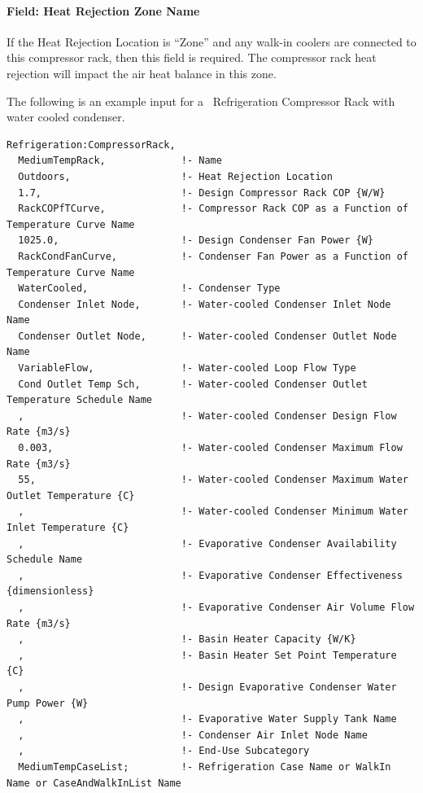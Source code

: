 \paragraph{Field: Heat Rejection Zone Name}\label{field-heat-rejection-zone-name}

If the Heat Rejection Location is ``Zone'' and any walk-in coolers are connected to this compressor rack, then this field is required. The compressor rack heat rejection will impact the air heat balance in this zone.

The following is an example input for a~ Refrigeration Compressor Rack with water cooled condenser.

\begin{lstlisting}
Refrigeration:CompressorRack,
  MediumTempRack,             !- Name
  Outdoors,                   !- Heat Rejection Location
  1.7,                        !- Design Compressor Rack COP {W/W}
  RackCOPfTCurve,             !- Compressor Rack COP as a Function of Temperature Curve Name
  1025.0,                     !- Design Condenser Fan Power {W}
  RackCondFanCurve,           !- Condenser Fan Power as a Function of Temperature Curve Name
  WaterCooled,                !- Condenser Type
  Condenser Inlet Node,       !- Water-cooled Condenser Inlet Node Name
  Condenser Outlet Node,      !- Water-cooled Condenser Outlet Node Name
  VariableFlow,               !- Water-cooled Loop Flow Type
  Cond Outlet Temp Sch,       !- Water-cooled Condenser Outlet Temperature Schedule Name
  ,                           !- Water-cooled Condenser Design Flow Rate {m3/s}
  0.003,                      !- Water-cooled Condenser Maximum Flow Rate {m3/s}
  55,                         !- Water-cooled Condenser Maximum Water Outlet Temperature {C}
  ,                           !- Water-cooled Condenser Minimum Water Inlet Temperature {C}
  ,                           !- Evaporative Condenser Availability Schedule Name
  ,                           !- Evaporative Condenser Effectiveness {dimensionless}
  ,                           !- Evaporative Condenser Air Volume Flow Rate {m3/s}
  ,                           !- Basin Heater Capacity {W/K}
  ,                           !- Basin Heater Set Point Temperature {C}
  ,                           !- Design Evaporative Condenser Water Pump Power {W}
  ,                           !- Evaporative Water Supply Tank Name
  ,                           !- Condenser Air Inlet Node Name
  ,                           !- End-Use Subcategory
  MediumTempCaseList;         !- Refrigeration Case Name or WalkIn Name or CaseAndWalkInList Name
\end{lstlisting}

